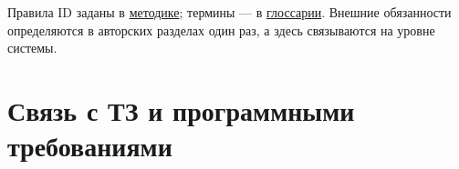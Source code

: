\documentclass[12pt,a4paper]{article}
\begin{document}
Правила ID заданы в \href{../notes/methodology/\%D0\%9C\%D0\%B5\%D1\%82\%D0\%BE\%D0\%B4\%D0\%B8\%D0\%BA\%D0\%B0_\%D0\%B8\%D0\%B4\%D0\%B5\%D0\%BD\%D1\%82\%D0\%B8\%D1\%84\%D0\%B8\%D0\%BA\%D0\%B0\%D1\%82\%D0\%BE\%D1\%80\%D0\%BE\%D0\%B2.pdf\#nameddest=\%D0\%BC\%D0\%B5\%D1\%82\%D0\%BE\%D0\%B4\%D0\%B8\%D0\%BA\%D0\%B0-\%D0\%B8\%D0\%B4\%D0\%B5\%D0\%BD\%D1\%82\%D0\%B8\%D1\%84\%D0\%B8\%D0\%BA\%D0\%B0\%D1\%82\%D0\%BE\%D1\%80\%D0\%BE\%D0\%B2}{методике}; термины --- в \href{../notes/methodology/\%D0\%93\%D0\%BB\%D0\%BE\%D1\%81\%D1\%81\%D0\%B0\%D1\%80\%D0\%B8\%D0\%B9.pdf\#nameddest=\%D0\%B3\%D0\%BB\%D0\%BE\%D1\%81\%D1\%81\%D0\%B0\%D1\%80\%D0\%B8\%D0\%B9}{глоссарии}. Внешние обязанности определяются в авторских разделах один раз, а здесь связываются на уровне системы.

\section{Связь с ТЗ и программными требованиями}\label{4-ux441ux432ux44fux437ux44c-ux441-ux442ux437-ux438-ux43fux440ux43eux433ux440ux430ux43cux43cux43dux44bux43cux438-ux442ux440ux435ux431ux43eux432ux430ux43dux438ux44fux43cux438}

\hypertarget{4-связь-с-тз-и-программными-требованиями}{}
\end{document}
